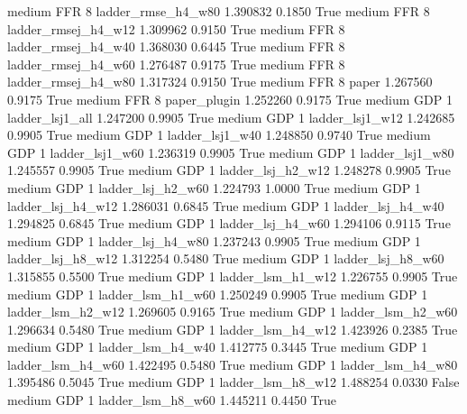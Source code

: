     medium      FFR                 8  ladder_rmse_h4_w80   1.390832      0.1850    True
    medium      FFR                 8 ladder_rmsej_h4_w12   1.309962      0.9150    True
    medium      FFR                 8 ladder_rmsej_h4_w40   1.368030      0.6445    True
    medium      FFR                 8 ladder_rmsej_h4_w60   1.276487      0.9175    True
    medium      FFR                 8 ladder_rmsej_h4_w80   1.317324      0.9150    True
    medium      FFR                 8               paper   1.267560      0.9175    True
    medium      FFR                 8        paper_plugin   1.252260      0.9175    True
    medium      GDP                 1     ladder_lsj1_all   1.247200      0.9905    True
    medium      GDP                 1     ladder_lsj1_w12   1.242685      0.9905    True
    medium      GDP                 1     ladder_lsj1_w40   1.248850      0.9740    True
    medium      GDP                 1     ladder_lsj1_w60   1.236319      0.9905    True
    medium      GDP                 1     ladder_lsj1_w80   1.245557      0.9905    True
    medium      GDP                 1   ladder_lsj_h2_w12   1.248278      0.9905    True
    medium      GDP                 1   ladder_lsj_h2_w60   1.224793      1.0000    True
    medium      GDP                 1   ladder_lsj_h4_w12   1.286031      0.6845    True
    medium      GDP                 1   ladder_lsj_h4_w40   1.294825      0.6845    True
    medium      GDP                 1   ladder_lsj_h4_w60   1.294106      0.9115    True
    medium      GDP                 1   ladder_lsj_h4_w80   1.237243      0.9905    True
    medium      GDP                 1   ladder_lsj_h8_w12   1.312254      0.5480    True
    medium      GDP                 1   ladder_lsj_h8_w60   1.315855      0.5500    True
    medium      GDP                 1   ladder_lsm_h1_w12   1.226755      0.9905    True
    medium      GDP                 1   ladder_lsm_h1_w60   1.250249      0.9905    True
    medium      GDP                 1   ladder_lsm_h2_w12   1.269605      0.9165    True
    medium      GDP                 1   ladder_lsm_h2_w60   1.296634      0.5480    True
    medium      GDP                 1   ladder_lsm_h4_w12   1.423926      0.2385    True
    medium      GDP                 1   ladder_lsm_h4_w40   1.412775      0.3445    True
    medium      GDP                 1   ladder_lsm_h4_w60   1.422495      0.5480    True
    medium      GDP                 1   ladder_lsm_h4_w80   1.395486      0.5045    True
    medium      GDP                 1   ladder_lsm_h8_w12   1.488254      0.0330   False
    medium      GDP                 1   ladder_lsm_h8_w60   1.445211      0.4450    True

